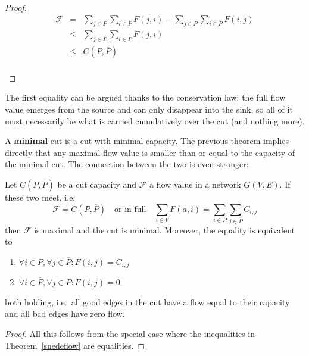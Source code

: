 \begin{proof}
\begin{eqnarray*}
\mathcal{F} %
        & = & \sum_{j \in P} \sum_{i \in \overline{P}} F(j,i) -
                \sum_{j \in P} \sum_{i \in \overline{P}} F(i,j)\\
        & \leq & \sum_{j \in P} \sum_{i \in \overline{P}} F(j,i)\\
        & \leq & C(P,\overline{P})
\end{eqnarray*}
\vspace{-3em}~\\
\end{proof}
The first equality can be argued thanks to the conservation law: the full flow value emerges from the source and can only disappear into the sink, so all of it must necessarily be what is carried cumulatively over the cut (and nothing more).

A \textbf{minimal} cut is a cut with minimal capacity. The previous
theorem implies directly that any maximal flow value is smaller than or
equal to the capacity of the minimal cut. The connection between the
two is even stronger:


 \begin{theorem}\label{maxflowmincut}
  Let $C(P,\overline{P})$ be a cut capacity and $\mathcal{F}$ a flow value in a network $G(V,E)$. If these two meet, i.e.\
\begin{equation*}
	\mathcal{F} = C(P,\overline{P})  \quad \text{or in full} \quad \sum_{i \in V} F(a,i) = \sum_{i \in P} \sum_{j \in \overline{P}} C_{i,j}
\end{equation*}
then $\mathcal{F}$ is maximal and the cut is minimal. Moreover, the equality is equivalent to
\begin{enumerate}
	\item $\forall i \in P, \forall j \in \overline{P}: F(i,j) = C_{i,j}$
	\item $\forall i \in \overline{P}, \forall j \in P: F(i,j) = 0$
\end{enumerate}
both holding, i.e.\ all good edges in the cut have a flow equal to their capacity and
all bad edges have zero flow.
\end{theorem}
\begin{proof}
All this follows from the special case where the inequalities in Theorem~\ref{snedeflow} are equalities.
\end{proof}

